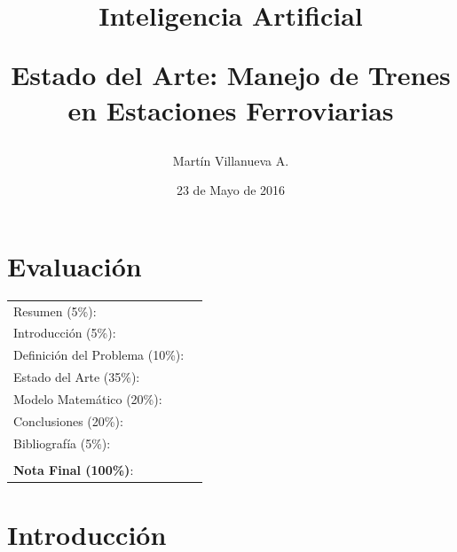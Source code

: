 \documentclass[letter, 10pt]{article}
\begin{document}
\title{Inteligencia Artificial \\ \begin{Large}Estado del Arte: Manejo de Trenes en Estaciones Ferroviarias\end{Large}}
\author{Martín Villanueva A.}
\date{23 de Mayo de 2016}
\maketitle


\section*{Evaluación}

\begin{tabular}{ll}
Resumen (5\%): & \underline{\hspace{2cm}} \\
Introducción (5\%):  & \underline{\hspace{2cm}} \\
Definición del Problema (10\%):  & \underline{\hspace{2cm}} \\
Estado del Arte (35\%):  & \underline{\hspace{2cm}} \\
Modelo Matemático (20\%): &  \underline{\hspace{2cm}}\\
Conclusiones (20\%): &  \underline{\hspace{2cm}}\\
Bibliografía (5\%): & \underline{\hspace{2cm}}\\
 &  \\
\textbf{Nota Final (100\%)}:   & \underline{\hspace{2cm}}
\end{tabular}
\vspace{2cm}


\begin{abstract}

\end{abstract}

\section{Introducción} \label{intro}
\end{document}
